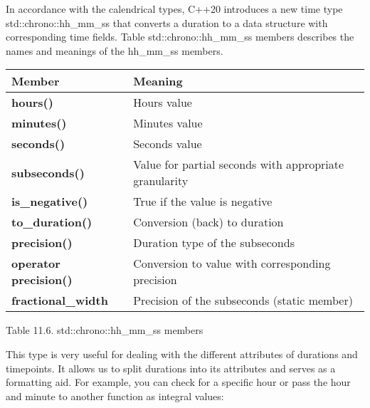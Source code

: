 
In accordance with the calendrical types, C++20 introduces a new time type std::chrono::hh\_mm\_ss that converts a duration to a data structure with corresponding time fields. Table std::chrono::hh\_mm\_ss members describes the names and meanings of the hh\_mm\_ss members.

\begin{longtable}[c]{|l|l|}
\hline
\textbf{Member}               & \textbf{Meaning}                                       \\ \hline
\endfirsthead
%
\endhead
%
\textbf{hours()}              & Hours value                                            \\ \hline
\textbf{minutes()}            & Minutes value                                          \\ \hline
\textbf{seconds()}            & Seconds value                                          \\ \hline
\textbf{subseconds()}         & Value for partial seconds with appropriate granularity \\ \hline
\textbf{is\_negative()}       & True if the value is negative                          \\ \hline
\textbf{to\_duration()}       & Conversion (back)  to duration                         \\ \hline
\textbf{precision()}          & Duration type of the subseconds                        \\ \hline
\textbf{operator precision()} & Conversion to value with corresponding precision       \\ \hline
\textbf{fractional\_width}    & Precision of the subseconds (static member)            \\ \hline
\end{longtable}

\begin{center}
Table 11.6. std::chrono::hh\_mm\_ss members
\end{center}

This type is very useful for dealing with the different attributes of durations and timepoints. It allows us to split durations into its attributes and serves as a formatting aid. For example, you can check for a specific hour or pass the hour and minute to another function as integral values:


